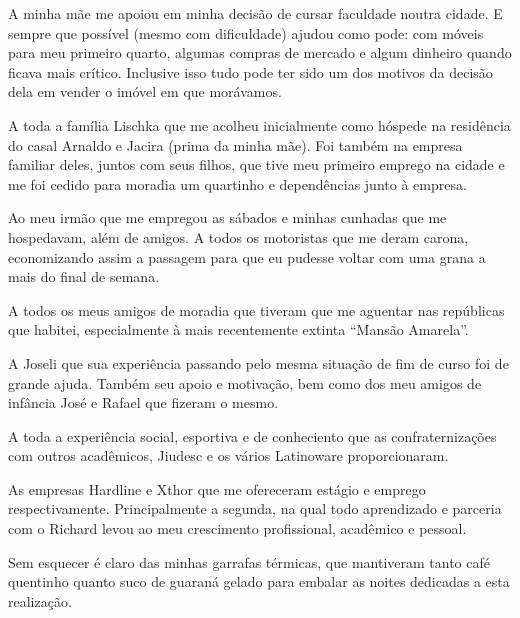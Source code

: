 
A minha mãe me apoiou em minha decisão de cursar faculdade noutra cidade. E sempre que possível (mesmo com dificuldade) ajudou como pode: com móveis para meu primeiro quarto, algumas compras de mercado e algum dinheiro quando ficava mais crítico. Inclusive isso tudo pode ter sido um dos motivos da decisão dela em vender o imóvel em que morávamos.

A toda a família Lischka que me acolheu inicialmente como hóspede na residência do casal Arnaldo e Jacira (prima da minha mãe). Foi também na empresa familiar deles, juntos com seus filhos, que tive meu primeiro emprego na cidade e me foi cedido para moradia um quartinho e dependências junto à empresa.

Ao meu irmão que me empregou as sábados e minhas cunhadas que me hospedavam, além de amigos. A todos os motoristas que me deram carona, economizando assim a passagem para que eu pudesse voltar com uma grana a mais do final de semana.

A todos os meus amigos de moradia que tiveram que me aguentar nas repúblicas que habitei, especialmente à mais recentemente extinta ``Mansão Amarela''.

A Joseli que sua experiência passando pelo mesma situação de fim de curso foi de grande ajuda. Também seu apoio e motivação, bem como dos meu amigos de infância José e Rafael que fizeram o mesmo.

A toda a experiência social, esportiva e de conheciento que as confraternizações com outros acadêmicos, Jiudesc e os vários Latinoware proporcionaram.

As empresas Hardline e Xthor que me ofereceram estágio e emprego respectivamente. Principalmente a segunda, na qual todo aprendizado e parceria com o Richard levou ao meu crescimento profissional, acadêmico e pessoal.

Sem esquecer é claro das minhas garrafas térmicas, que mantiveram tanto café quentinho quanto suco de guaraná gelado para embalar as noites dedicadas a esta realização.
